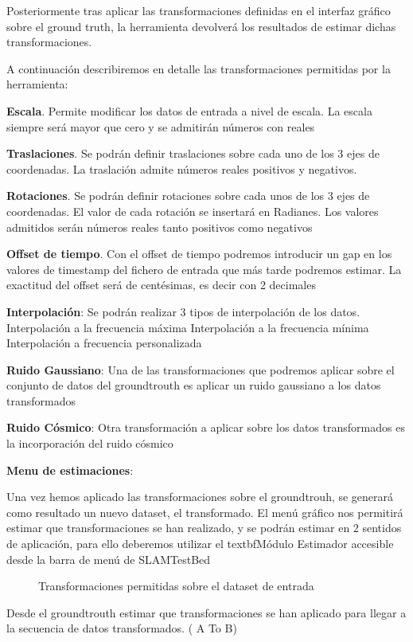 Posteriormente tras aplicar las transformaciones definidas en el interfaz gráfico sobre el ground truth, la herramienta devolverá los resultados de estimar dichas transformaciones.


A continuación describiremos en detalle las transformaciones permitidas por la herramienta:

\textbf{Escala}. Permite modificar los datos de entrada a nivel de escala. La escala siempre será mayor que cero y se admitirán números con reales

\textbf{Traslaciones}. Se podrán definir traslaciones sobre cada uno de los 3 ejes de coordenadas. 
La traslación admite números reales positivos y negativos.

\textbf{Rotaciones}. Se podrán definir rotaciones sobre cada unos de los 3 ejes de coordenadas. El valor de cada rotación se insertará en Radianes. Los valores admitidos serán números reales tanto positivos como negativos

\textbf{Offset de tiempo}. Con el offset de tiempo podremos introducir un gap en los valores de timestamp del fichero de entrada que más tarde podremos estimar. La exactitud del offset será de centésimas, es decir con 2 decimales

\textbf{Interpolación}: Se podrán realizar 3 tipos de interpolación de los datos.
	Interpolación a la frecuencia máxima
	Interpolación a la frecuencia mínima
	Interpolación a frecuencia personalizada

\textbf{Ruido Gaussiano}: Una de las transformaciones que podremos aplicar sobre el conjunto de datos del groundtrouth es aplicar un ruido gaussiano a los datos transformados

\textbf{Ruido Cósmico}: Otra transformación a aplicar sobre los datos transformados es la incorporación del ruido cósmico

\textbf{Menu de estimaciones}:


Una vez hemos aplicado las transformaciones sobre el groundtrouh, se generará como resultado un nuevo dataset, el transformado.
El menú gráfico nos permitirá estimar que transformaciones se han realizado, y se podrán estimar en 2 sentidos de aplicación, para ello deberemos utilizar el textbf{Módulo Estimador} accesible desde la barra de menú de SLAMTestBed

\begin{figure}[H]
\begin{center}
\hspace{0.5cm}
\end{center}
\caption{Transformaciones permitidas sobre el dataset de entrada }
\end{figure}
	Desde el groundtrouth estimar que transformaciones se han aplicado para llegar a la secuencia de datos transformados. ( A To B)


